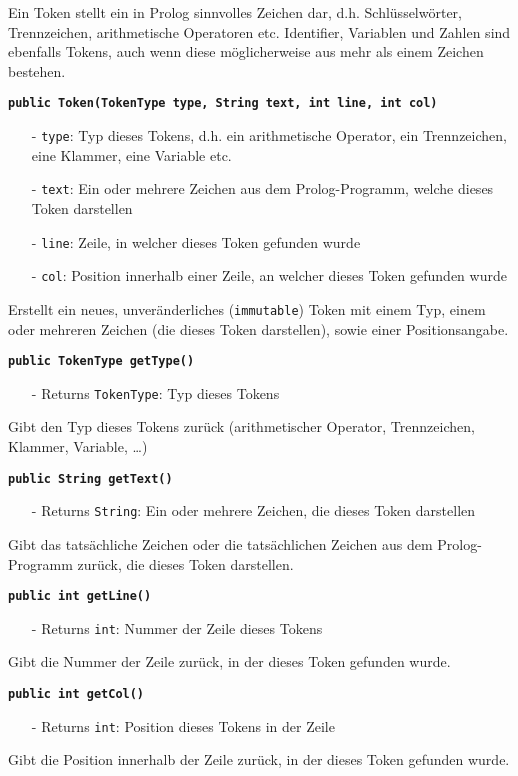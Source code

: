\documentclass[parskip=full,11pt,twoside]{scrartcl}
\begin{document}
Ein Token stellt ein in Prolog sinnvolles Zeichen dar, d.h. Schlüsselwörter, Trennzeichen, arithmetische Operatoren etc. Identifier, Variablen und Zahlen sind ebenfalls Tokens, auch wenn diese möglicherweise aus mehr als einem Zeichen bestehen.

\textbf{\texttt{public Token(TokenType type, String text, int line, int col)}}
\begin{itemize}[noitemsep]
	\item[-] \texttt{type}: Typ dieses Tokens, d.h. ein arithmetische Operator, ein Trennzeichen, eine Klammer, eine Variable etc.
	\item[-] \texttt{text}: Ein oder mehrere Zeichen aus dem Prolog-Programm, welche dieses Token darstellen
	\item[-] \texttt{line}: Zeile, in welcher dieses Token gefunden wurde
	\item[-] \texttt{col}: Position innerhalb einer Zeile, an welcher dieses Token gefunden wurde
\end{itemize}
Erstellt ein neues, unveränderliches (\texttt{immutable}) Token mit einem Typ, einem oder mehreren Zeichen (die dieses Token darstellen), sowie einer Positionsangabe.

\textbf{\texttt{public TokenType getType()}}
\begin{itemize}[noitemsep]
	\item[-] Returns \texttt{TokenType}: Typ dieses Tokens
\end{itemize}
Gibt den Typ dieses Tokens zurück (arithmetischer Operator, Trennzeichen, Klammer, Variable, \dots)

\textbf{\texttt{public String getText()}}
\begin{itemize}[noitemsep]
	\item[-] Returns \texttt{String}: Ein oder mehrere Zeichen, die dieses Token darstellen
\end{itemize}
Gibt das tatsächliche Zeichen oder die tatsächlichen Zeichen aus dem Prolog-Programm zurück, die dieses Token darstellen.

\textbf{\texttt{public int getLine()}}
\begin{itemize}[noitemsep]
	\item[-] Returns \texttt{int}: Nummer der Zeile dieses Tokens
\end{itemize}
Gibt die Nummer der Zeile zurück, in der dieses Token gefunden wurde.

\textbf{\texttt{public int getCol()}}
\begin{itemize}[noitemsep]
	\item[-] Returns \texttt{int}: Position dieses Tokens in der Zeile
\end{itemize}
Gibt die Position innerhalb der Zeile zurück, in der dieses Token gefunden wurde.
\end{document}
